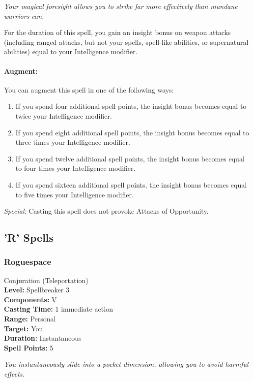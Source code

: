\emph{Your magical foresight allows you to strike far more effectively than mundane warriors can.}

For the duration of this spell, you gain an insight bonus on weapon attacks (including ranged attacks, but not your spells, spell-like abilities, or supernatural abilities) equal to your Intelligence modifier.

\paragraph{Augment:} You can augment this spell in one of the following ways:
\begin{enumerate}
 \item If you spend four additional spell points, the insight bonus becomes equal to twice your Intelligence modifier.
 \item If you spend eight additional spell points, the insight bonus becomes equal to three times your Intelligence modifier.
 \item If you spend twelve additional spell points, the insight bonus becomes equal to four times your Intelligence modifier.
 \item If you spend sixteen additional spell points, the insight bonus becomes equal to five times your Intelligence modifier.
\end{enumerate}

\emph{Special:} Casting this spell does not provoke Attacks of Opportunity.
\subsection{'R' Spells}
\subsubsection{Roguespace}
\label{Spell:Roguespace}
Conjuration (Teleportation)
\\ \textbf{Level:} Spellbreaker 3
\\ \textbf{Components:} V
\\ \textbf{Casting Time:} 1 immediate action
\\ \textbf{Range:} Personal
\\ \textbf{Target:} You
\\ \textbf{Duration:} Instantaneous
\\ \textbf{Spell Points:} 5

\emph{You instantaneously slide into a pocket dimension, allowing you to avoid harmful effects.}

